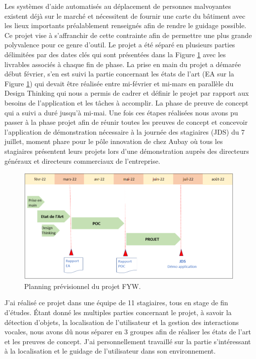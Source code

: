 \documentclass[11pt]{article}
\begin{document}
  Les systèmes d'aide automatisés au déplacement de personnes malvoyantes existent déjà sur le marché et nécessitent de fournir une 
  carte du bâtiment avec les lieux importants préalablement renseignés afin de rendre le guidage possible. Ce projet vise à s'affranchir 
  de cette contrainte afin de permettre une plus grande polyvalence pour ce genre d'outil.
  Le projet a été séparé en plusieurs parties délimitées par des dates clés qui sont présentées dans la Figure \ref{fig:Planning} 
  avec les livrables associés à chaque fin de phase.
  La prise en main du projet a démarée début février, s'en est suivi la partie concernant les états de l'art (EA sur la Figure \ref{fig:Planning}) 
  qui devait être réalisée entre mi-février et mi-mars en parallèle du Design Thinking qui nous a permis de cadrer et définir le projet par 
  rapport aux besoins de l'application et les tâches à accomplir. La phase de preuve de concept qui a suivi a duré jusqu'à mi-mai. 
  Une fois ces étapes réalisées nous avons pu passer à la phase projet afin de réunir toutes les preuves de concept et concevoir l'application 
  de démonstration nécessaire à la journée des stagiaires (JDS) du 7 juillet, moment phare pour le pôle innovation de chez Aubay où tous 
  les stagiaires présentent leurs projets lors d'une démonstration auprès des directeurs généraux et directeurs commerciaux de l'entreprise.

  \begin{figure}[hbt]  
    \includegraphics[width=\textwidth]{Planning.png}    
    \caption{Planning prévisionnel du projet FYW.}
    \label{fig:Planning}
  \end{figure}  
  
  J'ai réalisé ce projet dans une équipe de 11 stagiaires, tous en stage de fin d'études. Étant donné les multiples parties concernant le projet, 
  à savoir la détection d'objets, la localisation de l'utilisateur et la gestion des interactions vocales, nous avons dû nous séparer en 3 
  groupes afin de réaliser les états de l'art et les preuves de concept. J'ai personnellement travaillé sur la partie s'intéressant à la 
  localisation et le guidage de l'utilisateur dans son environnement. 
  \pagebreak
 
\end{document}
